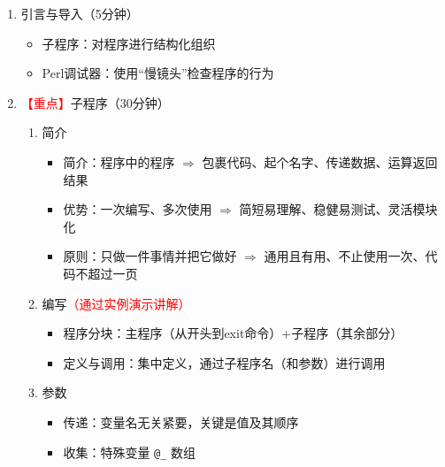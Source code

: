 \documentclass{TIJMUjiaoanLL}
\begin{document}
\begin{enumerate}
  \item 引言与导入（5分钟）
    \begin{itemize}
      \item 子程序：对程序进行结构化组织
      \item Perl调试器：使用“慢镜头”检查程序的行为
    \end{itemize}
  \item \textcolor{red}{【重点】}子程序（30分钟）
    \begin{enumerate}
      \item 简介
	\begin{itemize}
	  \item 简介：程序中的程序 $\Longrightarrow$ 包裹代码、起个名字、传递数据、运算返回结果
	  \item 优势：一次编写、多次使用 $\Longrightarrow$ 简短易理解、稳健易测试、灵活模块化
	  \item 原则：只做一件事情并把它做好 $\Longrightarrow$ 通用且有用、不止使用一次、代码不超过一页
	\end{itemize}
      \item 编写\textcolor{red}{（通过实例演示讲解）}
	\begin{itemize}
	  \item 程序分块：主程序（从开头到exit命令）+子程序（其余部分）
	  \item 定义与调用：集中定义，通过子程序名（和参数）进行调用
	\end{itemize}
\vspace*{-1em}
\vspace*{-1em}
      \item 参数
	\begin{itemize}
	  \item 传递：变量名无关紧要，关键是值及其顺序
	  \item 收集：特殊变量 \verb|@_| 数组

\end{itemize}
\end{enumerate}
\end{enumerate}
\end{document}
